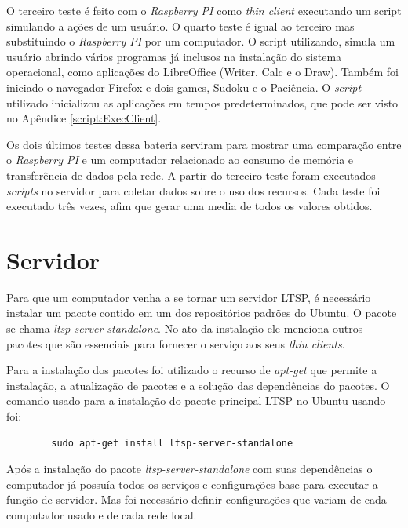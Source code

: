 \documentclass[
	12pt,				%
	openright,			%
	twoside,			%
	a4paper,			%
	chapter=TITLE,		%
	english,			%
	brazil				%
	]{abntex2}
\begin{document}
O terceiro teste é feito com o \textit{Raspberry PI} como \textit{thin client} executando um script simulando a ações de um usuário. O quarto teste é igual ao terceiro mas substituindo o  \textit{Raspberry PI} por um computador. O script utilizando, simula um usuário abrindo vários programas já inclusos na instalação do sistema operacional, como aplicações do LibreOffice (Writer, Calc e o Draw). Também foi iniciado o navegador Firefox e dois games, Sudoku e o Paciência. O \textit{script} utilizado inicializou as aplicações em tempos predeterminados, que pode ser visto no Apêndice \ref{script:ExecClient}.

Os dois últimos testes dessa bateria serviram para mostrar uma comparação entre o \textit{Raspberry PI} e um computador relacionado ao consumo de memória e transferência de dados pela rede. A partir do terceiro teste foram executados \textit{scripts} no servidor para coletar dados sobre o uso dos recursos. Cada teste foi executado três vezes, afim que gerar uma media de todos os valores obtidos. 


\chapter{Servidor}
\label{confServ}
Para que um computador venha a se tornar um servidor LTSP, é necessário instalar um pacote contido em um dos repositórios padrões do Ubuntu. O pacote se chama  \textit{ltsp-server-standalone}. No ato da instalação ele menciona outros pacotes que são  essenciais para fornecer o serviço aos seus \textit{thin clients}.

Para a instalação dos pacotes foi utilizado o recurso de \textit{apt-get} que permite a instalação, a atualização de pacotes e a solução das dependências do pacotes\cite{apt_get}. O comando usado para a instalação do pacote principal LTSP no Ubuntu usando foi:
\begin{verbatim}
		sudo apt-get install ltsp-server-standalone
\end{verbatim}
Após a instalação do pacote \textit{ltsp-server-standalone} com suas dependências o computador já possuía todos os serviços e configurações base para executar a função de servidor. Mas foi necessário definir configurações que variam de cada computador usado e de cada rede local. 
\end{document}
